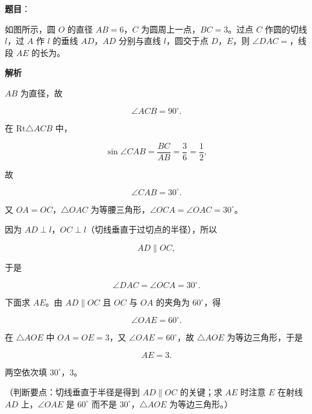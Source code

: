 \begin{answer}

\textbf{题目}：

如图所示，圆 $O$ 的直径 $AB=6$，$C$ 为圆周上一点，$BC=3$。过点 $C$ 作圆的切线 $l$，过 $A$ 作 $l$ 的垂线 $AD$，$AD$ 分别与直线 $l$，圆交于点 $D$，$E$，则 $\angle DAC=$\gkblank{}，线段 $AE$ 的长为\gkblank{}。
\nopagebreak[4]
\begin{center}\end{center}
\nopagebreak[4]
\textbf{解析}

$AB$ 为直径，故

\nopagebreak[4]
\[\angle ACB=90^\circ.\]

在 $\mathrm{Rt}\triangle ACB$ 中，

\nopagebreak[4]
\[\sin\angle CAB=\frac{BC}{AB}=\frac36=\frac12,\]

故

\nopagebreak[4]
\[\angle CAB=30^\circ.\]

又 $OA=OC$，$\triangle OAC$ 为等腰三角形，$\angle OCA=\angle OAC=30^\circ$。

因为 $AD\perp l$，$OC\perp l$（切线垂直于过切点的半径），所以

\nopagebreak[4]
\[AD\parallel OC,\]

于是

\nopagebreak[4]
\[\angle DAC=\angle OCA=30^\circ.\]

下面求 $AE$。由 $AD\parallel OC$ 且 $OC$ 与 $OA$ 的夹角为 $60^\circ$，得

\nopagebreak[4]
\[\angle OAE=60^\circ.\]

在 $\triangle AOE$ 中 $OA=OE=3$，又 $\angle OAE=60^\circ$，故 $\triangle AOE$ 为等边三角形，于是

\nopagebreak[4]
\[AE=3.\]

两空依次填 $30^\circ$，$3$。

（判断要点：切线垂直于半径是得到 $AD\parallel OC$ 的关键；求 $AE$ 时注意 $E$ 在射线 $AD$ 上，$\angle OAE$ 是 $60^\circ$ 而不是 $30^\circ$，$\triangle AOE$ 为等边三角形。）


\end{answer}

